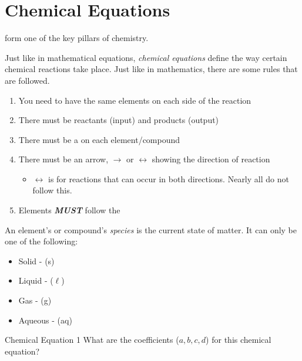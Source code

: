 \section{Chemical Equations} \label{sec:Chemical Equations}
 form one of the key pillars of chemistry.
\begin{definition} \label{def:Chemical Equations}
  Just like in mathematical equations, \emph{chemical equations} define the way certain chemical reactions take place.
  Just like in mathematics, there are some rules that are followed.
  \begin{enumerate}
    \item You need to have the same elements on each side of the reaction
    \item There must be reactants (input) and products (output)
    \item There must be a \emph{} on each element/compound
    \item There must be an arrow, $\rightarrow$ or $\leftrightarrow$ showing the direction of reaction
    \begin{itemize}[noitemsep, nolistsep]
      \item $\leftrightarrow$ is for reactions that can occur in both directions. Nearly all do not follow this.
    \end{itemize}
    \item Elements \textbf{\emph{MUST}} follow the 
  \end{enumerate}
\end{definition}

\begin{definition}[Species] \label{def:Species}
  An element's or compound's \emph{species} is the current state of matter.
  It can only be one of the following:
  \begin{itemize}[noitemsep, nolistsep]
    \item Solid - (s)
    \item Liquid - ($\ell$)
    \item Gas - (g)
    \item Aqueous - (aq)
  \end{itemize}
\end{definition}

\begin{example}[]{Chemical Equation 1}
  What are the coefficients ($a, b, c, d$) for this chemical equation? \\
  
  \tcblower
  
\end{example}

